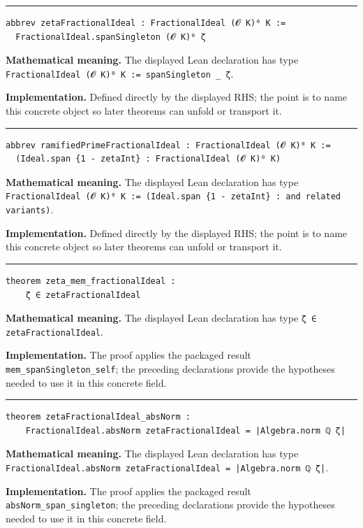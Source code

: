 \documentclass[UTF8,a4paper,11pt,fontset=fandol]{ctexart}
\theoremstyle{definition}
\newcommand{\statementsep}{\par\medskip\hrule\medskip}
\begin{document}
\statementsep
\begin{verbatim}
abbrev zetaFractionalIdeal : FractionalIdeal (𝓞 K)⁰ K :=
  FractionalIdeal.spanSingleton (𝓞 K)⁰ ζ
\end{verbatim}
\noindent\textbf{Mathematical meaning.} The displayed Lean declaration has type \texttt{FractionalIdeal (𝓞 K)⁰ K := spanSingleton \_\allowbreak{} ζ}.\par
\noindent\textbf{Implementation.} Defined directly by the displayed RHS; the point is to name this concrete object so later theorems can unfold or transport it.\par
\statementsep
\begin{verbatim}
abbrev ramifiedPrimeFractionalIdeal : FractionalIdeal (𝓞 K)⁰ K :=
  (Ideal.span {1 - zetaInt} : FractionalIdeal (𝓞 K)⁰ K)
\end{verbatim}
\noindent\textbf{Mathematical meaning.} The displayed Lean declaration has type \texttt{FractionalIdeal (𝓞 K)⁰ K := (Ideal.\allowbreak{}span \{1 - zetaInt\} : and related variants)}.\par
\noindent\textbf{Implementation.} Defined directly by the displayed RHS; the point is to name this concrete object so later theorems can unfold or transport it.\par
\statementsep
\begin{verbatim}
theorem zeta_mem_fractionalIdeal :
    ζ ∈ zetaFractionalIdeal
\end{verbatim}
\noindent\textbf{Mathematical meaning.} The displayed Lean declaration has type \texttt{ζ ∈ zetaFractionalIdeal}.\par
\noindent\textbf{Implementation.} The proof applies the packaged result \texttt{mem\_\allowbreak{}spanSingleton\_\allowbreak{}self}; the preceding declarations provide the hypotheses needed to use it in this concrete field.\par
\statementsep
\begin{verbatim}
theorem zetaFractionalIdeal_absNorm :
    FractionalIdeal.absNorm zetaFractionalIdeal = |Algebra.norm ℚ ζ|
\end{verbatim}
\noindent\textbf{Mathematical meaning.} The displayed Lean declaration has type \texttt{FractionalIdeal.\allowbreak{}absNorm zetaFractionalIdeal = |Algebra.\allowbreak{}norm ℚ ζ|}.\par
\noindent\textbf{Implementation.} The proof applies the packaged result \texttt{absNorm\_\allowbreak{}span\_\allowbreak{}singleton}; the preceding declarations provide the hypotheses needed to use it in this concrete field.\par
\end{document}
